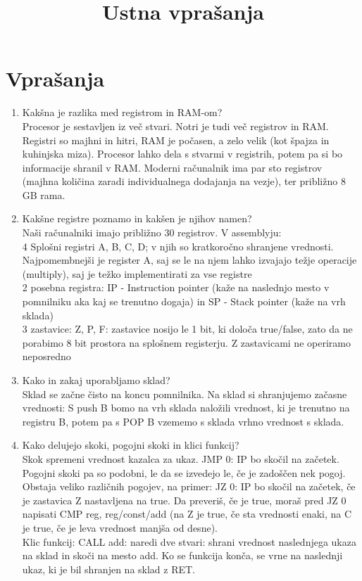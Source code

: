 \documentclass[a4paper]{article}
\title{Ustna vprašanja}
\author{}
\date{}
\begin{document}
\maketitle
\section*{Vprašanja}
    \begin{enumerate}
        \item Kakšna je razlika med registrom in RAM-om?\\
        Procesor je sestavljen iz več stvari. Notri je tudi več registrov in RAM. Registri so majhni in hitri, RAM je počasen, a zelo velik (kot špajza in kuhinjska miza). Procesor lahko dela s stvarmi v registrih, potem pa si bo informacije shranil v RAM. Moderni računalnik ima par sto registrov (majhna količina zaradi individualnega dodajanja na vezje), ter približno 8 GB rama.
    
        \item Kakšne registre poznamo in kakšen je njihov namen?\\
        Naši računalniki imajo približno 30 registrov. V assemblyju:\\
         4 Splošni registri A, B, C, D; v njih so kratkoročno shranjene vrednosti. Najpomembnejši je register A, saj se le na njem lahko izvajajo težje operacije (multiply), saj je težko implementirati za vse registre\\
         2 posebna registra: IP - Instruction pointer (kaže na naslednjo mesto v pomnilniku aka kaj se trenutno dogaja) in SP - Stack pointer (kaže na vrh sklada)\\
         3 zastavice: Z, P, F: zastavice nosijo le 1 bit, ki določa true/false, zato da ne porabimo 8 bit prostora na splošnem registerju. Z zastavicami ne operiramo neposredno
        
        \item Kako in zakaj uporabljamo sklad?\\
        Sklad se začne čisto na koncu pomnilnika.
        Na sklad si shranjujemo začasne vrednosti: S push B bomo na vrh sklada naložili vrednost, ki je trenutno na registru B, potem pa s POP B vzememo s sklada vrhno vrednost s sklada.
    
        \item Kako delujejo skoki, pogojni skoki in klici funkcij?\\
        Skok spremeni vrednost kazalca za ukaz. JMP 0: IP bo skočil na začetek.\\
        Pogojni skoki pa so podobni, le da se izvedejo le, če je zadoščen nek pogoj. Obstaja veliko različnih pogojev, na primer: JZ 0: IP bo skočil na začetek, če je zastavica Z nastavljena na true. Da preveriš, če je true, moraš pred JZ 0 napisati CMP reg, reg/const/add (na Z je true, če sta vrednosti enaki, na C je true, če je leva vrednost manjša od desne).\\
        Klic funkcij: CALL add: naredi dve stvari: shrani vrednost naslednjega ukaza na sklad in skoči na mesto add. Ko se funkcija konča, se vrne na naslednji ukaz, ki je bil shranjen na sklad z RET.
    

\end{enumerate}
\end{document}
